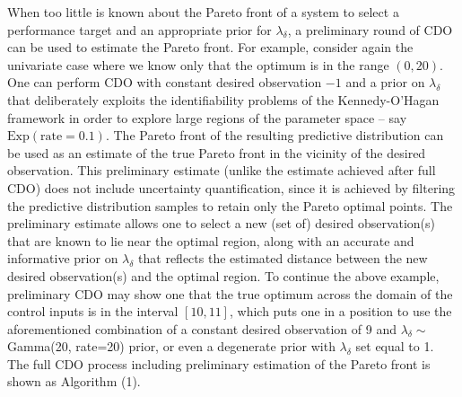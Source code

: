 \documentclass[12pt]{article}
\begin{document}
When too little is known about the Pareto front of a system to select a performance target and an appropriate prior for $\lambda_\delta$, a preliminary round of CDO can be used to estimate the Pareto front.
%
For example, consider again the univariate case where we know only that the optimum is in the range $(0,20)$. 
%
One can perform CDO with constant desired observation $-1$ and a prior on $\lambda_\delta$ that deliberately exploits the identifiability problems of the Kennedy-O'Hagan framework in order to explore large regions of the parameter space -- say $\mathrm{Exp}(\mathrm{rate}=0.1)$. %
%
The Pareto front of the resulting predictive distribution can be used as an estimate of the true Pareto front in the vicinity of the desired observation.
%
This preliminary estimate (unlike the estimate achieved after full CDO) does not include uncertainty quantification, since it is achieved by filtering the predictive distribution samples to retain only the Pareto optimal points.
%
The preliminary estimate allows one to select a new (set of) desired observation(s) that are known to lie near the optimal region, along with an accurate and informative prior on $\lambda_\delta$ that reflects the estimated distance between the new desired observation(s) and the optimal region.
%
To continue the above example, preliminary CDO may show one that the true optimum across the domain of the control inputs is in the interval $[10,11]$, which puts one in a position to use the aforementioned combination of a constant desired observation of 9 and $\lambda_\delta\sim$ Gamma(20, rate=20) prior, or even a degenerate prior with $\lambda_\delta$ set equal to 1.
%
The full CDO process including preliminary estimation of the Pareto front is shown as Algorithm (1).
\end{document}
